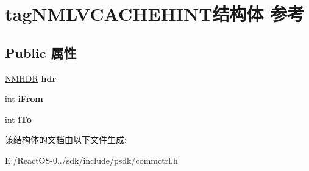 \hypertarget{structtag_n_m_l_v_c_a_c_h_e_h_i_n_t}{}\section{tag\+N\+M\+L\+V\+C\+A\+C\+H\+E\+H\+I\+N\+T结构体 参考}
\label{structtag_n_m_l_v_c_a_c_h_e_h_i_n_t}
\subsection*{Public 属性}
\begin{DoxyCompactItemize}
\item 
\mbox{\label{structtag_n_m_l_v_c_a_c_h_e_h_i_n_t_a5fc9efc5ccaf73a49d27f7d7d8fca2fd}} 
\hyperlink{structtag_n_m_h_d_r}{N\+M\+H\+DR} {\bfseries hdr}
\item 
\mbox{\label{structtag_n_m_l_v_c_a_c_h_e_h_i_n_t_a20a5c6a21653aadd540516a5e2f8e90f}} 
int {\bfseries i\+From}
\item 
\mbox{\label{structtag_n_m_l_v_c_a_c_h_e_h_i_n_t_a042808e4df6f906baf37ecfab7082383}} 
int {\bfseries i\+To}
\end{DoxyCompactItemize}


该结构体的文档由以下文件生成\+:\begin{DoxyCompactItemize}
\item 
E\+:/\+React\+O\+S-\/0../sdk/include/psdk/commctrl.\+h\end{DoxyCompactItemize}
